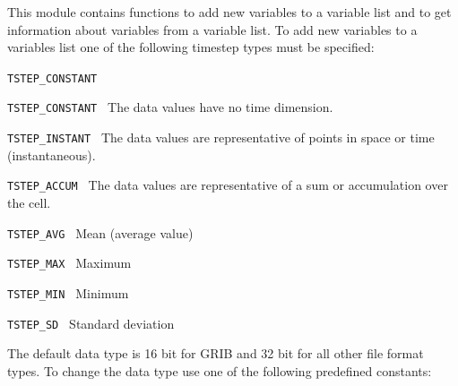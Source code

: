 This module contains functions to add new variables to a
variable list and to get information about variables from
a variable list. To add new variables to a variables list
one of the following timestep types must be specified:

\vspace*{3mm}
\hspace*{8mm}\begin{minipage}{15cm}
\begin{deflist}{{\large\tt TSTEP\_CONSTANT \ \ }}
\item[{\large\tt TSTEP\_CONSTANT }]  The data values have no time dimension.
\item[{\large\tt TSTEP\_INSTANT }]  The data values are representative of points in space or time (instantaneous).
\item[{\large\tt TSTEP\_ACCUM }]  The data values are representative of a sum or accumulation over the cell.
\item[{\large\tt TSTEP\_AVG }]  Mean (average value)  
\item[{\large\tt TSTEP\_MAX }]  Maximum  
\item[{\large\tt TSTEP\_MIN }]  Minimum
\item[{\large\tt TSTEP\_SD }]  Standard deviation
\end{deflist}
\end{minipage}
\vspace*{3mm}

The default data type is 16 bit for GRIB and 32 bit for all other file
format types. To change the data type use one of the following 
predefined constants:

